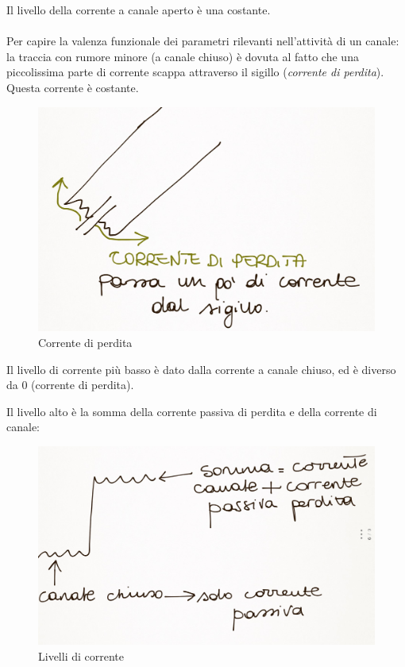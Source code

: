 \documentclass[a4paper,12pt]{article}
\begin{document}
Il livello della corrente a canale aperto è una costante.

\paragraph{}
Per capire la valenza funzionale dei parametri rilevanti nell'attività di un canale: la traccia con rumore minore (a canale chiuso) è dovuta al fatto che una piccolissima parte di corrente scappa attraverso il sigillo (\emph{corrente di perdita}). Questa corrente è costante. 
\begin{figure}[H]
\centering
\includegraphics[scale=0.1]{immagine/5.jpg}
\caption{Corrente di perdita}
\end{figure}

Il livello di corrente più basso è dato dalla corrente a canale chiuso, ed è diverso da 0 (corrente di perdita).

Il livello alto è la somma della corrente passiva di perdita e della corrente di canale:

\begin{figure}[H]
\centering
\includegraphics[scale=0.1]{immagine/6.jpg}
\caption{Livelli di corrente}
\end{figure}
\end{document}
